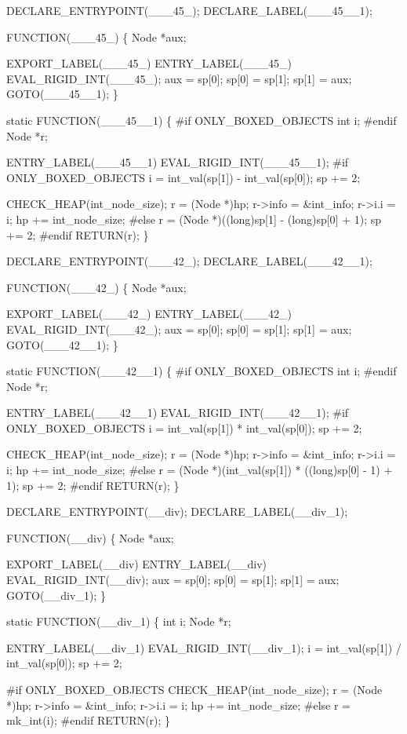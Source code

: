 DECLARE_ENTRYPOINT(___45_);
DECLARE_LABEL(___45__1);

FUNCTION(___45_)
\{
    Node *aux;

    EXPORT_LABEL(___45_)
 ENTRY_LABEL(___45_)
    EVAL_RIGID_INT(___45_);
    aux   = sp[0];
    sp[0] = sp[1];
    sp[1] = aux;
    GOTO(___45__1);
\}

static
FUNCTION(___45__1)
\{
#if ONLY_BOXED_OBJECTS
    int  i;
#endif
    Node *r;

 ENTRY_LABEL(___45__1)
    EVAL_RIGID_INT(___45__1);
#if ONLY_BOXED_OBJECTS
    i   = int_val(sp[1]) - int_val(sp[0]);
    sp += 2;

    CHECK_HEAP(int_node_size);
    r       = (Node *)hp;
    r->info = &int_info;
    r->i.i  = i;
    hp     += int_node_size;
#else
    r = (Node *)((long)sp[1] - (long)sp[0] + 1);
    sp += 2;
#endif
    RETURN(r);
\}


DECLARE_ENTRYPOINT(___42_);
DECLARE_LABEL(___42__1);

FUNCTION(___42_)
\{
    Node *aux;

    EXPORT_LABEL(___42_)
 ENTRY_LABEL(___42_)
    EVAL_RIGID_INT(___42_);
    aux   = sp[0];
    sp[0] = sp[1];
    sp[1] = aux;
    GOTO(___42__1);
\}

static
FUNCTION(___42__1)
\{
#if ONLY_BOXED_OBJECTS
    int  i;
#endif
    Node *r;

 ENTRY_LABEL(___42__1)
    EVAL_RIGID_INT(___42__1);
#if ONLY_BOXED_OBJECTS
    i   = int_val(sp[1]) * int_val(sp[0]);
    sp += 2;

    CHECK_HEAP(int_node_size);
    r       = (Node *)hp;
    r->info = &int_info;
    r->i.i  = i;
    hp     += int_node_size;
#else
    r = (Node *)(int_val(sp[1]) * ((long)sp[0] - 1) + 1);
    sp += 2;
#endif
    RETURN(r);
\}

DECLARE_ENTRYPOINT(__div);
DECLARE_LABEL(__div_1);

FUNCTION(__div)
\{
    Node *aux;

    EXPORT_LABEL(__div)
 ENTRY_LABEL(__div)
    EVAL_RIGID_INT(__div);
    aux   = sp[0];
    sp[0] = sp[1];
    sp[1] = aux;
    GOTO(__div_1);
\}

static
FUNCTION(__div_1)
\{
    int  i;
    Node *r;

 ENTRY_LABEL(__div_1)
    EVAL_RIGID_INT(__div_1);
    i   = int_val(sp[1]) / int_val(sp[0]);
    sp += 2;

#if ONLY_BOXED_OBJECTS
    CHECK_HEAP(int_node_size);
    r       = (Node *)hp;
    r->info = &int_info;
    r->i.i  = i;
    hp     += int_node_size;
#else
    r = mk_int(i);
#endif
    RETURN(r);
\}


